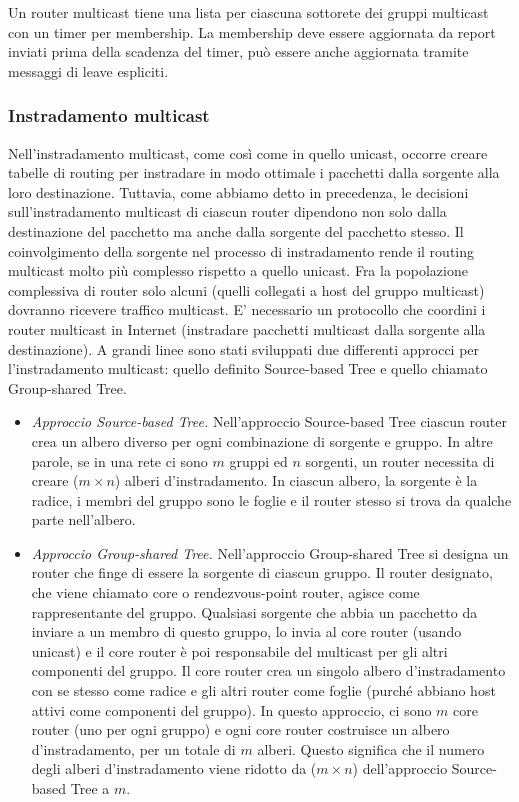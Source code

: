 Un router multicast tiene una lista per ciascuna sottorete dei gruppi multicast con un timer per membership. La membership deve essere aggiornata da report inviati prima della scadenza del timer, può essere anche aggiornata tramite messaggi di leave espliciti.

\subsubsection{Instradamento multicast}
Nell'instradamento multicast, come così come in quello unicast, occorre creare tabelle di routing per instradare in modo ottimale i pacchetti dalla sorgente alla loro destinazione. Tuttavia, come abbiamo detto in precedenza, le decisioni sull'instradamento multicast di ciascun router dipendono non solo dalla destinazione del pacchetto ma anche dalla sorgente del pacchetto stesso. Il coinvolgimento della sorgente nel processo di instradamento rende il routing multicast molto più complesso rispetto a quello unicast. Fra la popolazione complessiva di router solo alcuni (quelli collegati a
host del gruppo multicast) dovranno ricevere traffico multicast. E' necessario un protocollo che coordini i router multicast in Internet (instradare pacchetti multicast dalla sorgente alla destinazione). A grandi linee sono stati sviluppati due differenti approcci per l'instradamento multicast: quello definito Source-based Tree e quello chiamato Group-shared Tree.

\begin{itemize}
    \item \textit{Approccio Source-based Tree.} Nell'approccio Source-based Tree ciascun router crea un albero diverso per ogni combinazione di sorgente e gruppo. In altre parole, se in una rete ci sono $m$ gruppi ed $n$ sorgenti, un router necessita di creare ($m \times n$) alberi d'instradamento. In ciascun albero, la sorgente è la radice, i membri del gruppo sono le foglie e il router stesso si trova da qualche parte nell'albero.

    \item \textit{Approccio Group-shared Tree.} Nell'approccio Group-shared Tree si designa un router che finge di essere la sorgente di ciascun gruppo. Il router designato, che viene chiamato core o rendezvous-point router, agisce come rappresentante del gruppo. Qualsiasi sorgente che abbia un pacchetto da inviare a un membro di questo gruppo, lo invia al core router (usando unicast) e il core router è poi responsabile del multicast per gli altri componenti del gruppo. Il core router crea un singolo albero d'instradamento con se stesso come radice e gli altri router come foglie (purché abbiano host attivi come componenti del gruppo). In questo approccio, ci sono $m$ core router (uno per ogni gruppo) e ogni core router costruisce un albero d'instradamento, per un totale di $m$ alberi. Questo significa che il numero degli alberi d'instradamento viene ridotto da ($m\times n$) dell'approccio Source-based Tree a $m$.
\end{itemize}


